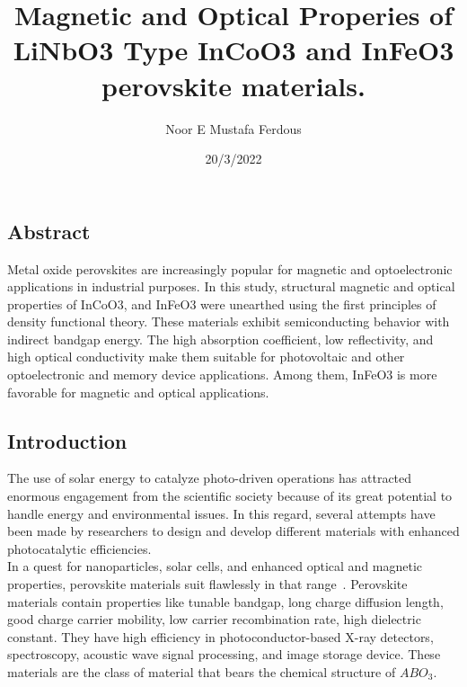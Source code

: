 \documentclass[12pt, letterpaper]{article}
\title{Magnetic and Optical Properies of  LiNbO3 Type InCoO3 and InFeO3 perovskite materials.}
\author{Noor E Mustafa Ferdous}
\date{20/3/2022}
\newcommand*{\1}{\hspace{1pt}}
\begin{document}
    \maketitle
    \subsection*{Abstract}
    Metal oxide perovskites are increasingly popular for magnetic and optoelectronic applications in industrial purposes. In this study, structural magnetic and 
    optical properties of InCoO3, and InFeO3 were unearthed using the first principles of density functional theory. These materials exhibit semiconducting behavior 
    with indirect bandgap energy. The high absorption coefficient, low reflectivity, and high optical conductivity make them suitable for photovoltaic and other 
    optoelectronic and memory device applications. Among them, InFeO3 is more favorable for magnetic and optical applications\cite{r4}.

    \subsection*{Introduction}
    The use of solar energy to catalyze photo-driven operations has 
    attracted enormous engagement from the scientific society because of 
    its great potential to handle energy and environmental issues. In this 
    regard, several attempts have been made by researchers to design and 
    develop different materials with enhanced photocatalytic efficiencies.\cite{r12}\\
    In a quest for nanoparticles, solar cells, and enhanced optical and magnetic properties, perovskite materials suit flawlessly in that range~\cite{r1}. Perovskite materials 
    contain properties like tunable bandgap, long charge diffusion length, good charge carrier mobility, low carrier recombination rate, high dielectric constant. 
    They have high efficiency in photoconductor-based X-ray detectors, spectroscopy, acoustic wave signal processing, and image storage device. These materials are 
    the class of material that bears the chemical structure of $ABO_{3}$\cite{r2,r13,r14}.
    
\end{document}
